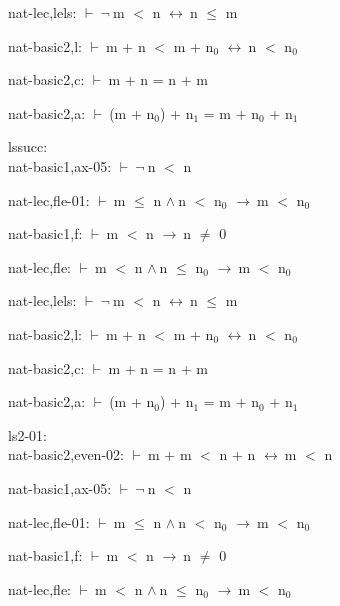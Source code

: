 \documentclass[a4paper]{article}
\newcommand{\Fol}{\mbox{$\vdash\ $}}
\newcommand{\Not}{\mbox{$\neg\ $}}
\newcommand{\And}{\mbox{$\wedge\ $}}
\newcommand{\Imp}{\mbox{$\rightarrow\ $}}
\newcommand{\Equiv}{\mbox{$\leftrightarrow\ $}}
\begin{document}
nat-lec,lels: 
 \Fol \Not m $<$ n \Equiv n $\le$ m



nat-basic2,l: 
 \Fol m + n $<$ m + $\mbox{n}_{0}$ \Equiv n $<$ $\mbox{n}_{0}$



nat-basic2,c: 
 \Fol m + n = n + m



nat-basic2,a: 
 \Fol (m + $\mbox{n}_{0}$) + $\mbox{n}_{1}$ = m + $\mbox{n}_{0}$ + $\mbox{n}_{1}$



\bigskip

lssucc:\\ nat-basic1,ax-05: 
 \Fol \Not n $<$ n



nat-lec,fle-01: 
 \Fol m $\le$ n \And n $<$ $\mbox{n}_{0}$ \Imp m $<$ $\mbox{n}_{0}$



nat-basic1,f: 
 \Fol m $<$ n \Imp n $\neq$ 0



nat-lec,fle: 
 \Fol m $<$ n \And n $\le$ $\mbox{n}_{0}$ \Imp m $<$ $\mbox{n}_{0}$



nat-lec,lels: 
 \Fol \Not m $<$ n \Equiv n $\le$ m



nat-basic2,l: 
 \Fol m + n $<$ m + $\mbox{n}_{0}$ \Equiv n $<$ $\mbox{n}_{0}$



nat-basic2,c: 
 \Fol m + n = n + m



nat-basic2,a: 
 \Fol (m + $\mbox{n}_{0}$) + $\mbox{n}_{1}$ = m + $\mbox{n}_{0}$ + $\mbox{n}_{1}$



\bigskip

ls2-01:\\ nat-basic2,even-02: 
 \Fol m + m $<$ n + n \Equiv m $<$ n



nat-basic1,ax-05: 
 \Fol \Not n $<$ n



nat-lec,fle-01: 
 \Fol m $\le$ n \And n $<$ $\mbox{n}_{0}$ \Imp m $<$ $\mbox{n}_{0}$



nat-basic1,f: 
 \Fol m $<$ n \Imp n $\neq$ 0



nat-lec,fle: 
 \Fol m $<$ n \And n $\le$ $\mbox{n}_{0}$ \Imp m $<$ $\mbox{n}_{0}$
\end{document}
